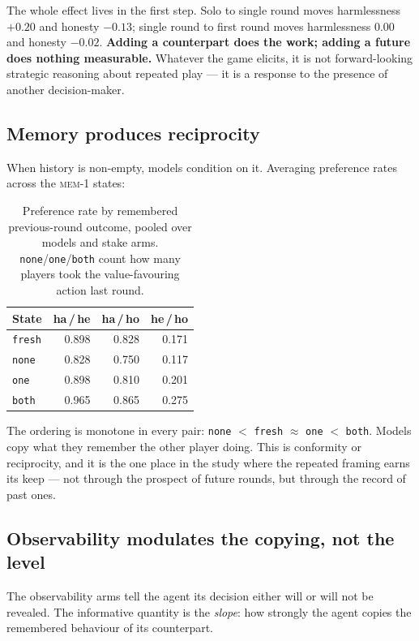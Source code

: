 \documentclass[11pt]{article}
\begin{document}
The whole effect lives in the first step. Solo to single round moves harmlessness
$+0.20$ and honesty $-0.13$; single round to first round moves harmlessness
$0.00$ and honesty $-0.02$. \textbf{Adding a counterpart does the work; adding a
future does nothing measurable.} Whatever the game elicits, it is not
forward-looking strategic reasoning about repeated play --- it is a response to
the presence of another decision-maker.

\subsection{Memory produces reciprocity}

When history is non-empty, models condition on it. Averaging preference rates
across the \textsc{mem-1} states:

\begin{table}[h]\centering\small
\caption{Preference rate by remembered previous-round outcome, pooled over
models and stake arms. \texttt{none}/\texttt{one}/\texttt{both} count how many
players took the value-favouring action last round.}
\label{tab:state}
\begin{tabular}{lrrr}
\toprule
State & ha\,/\,he & ha\,/\,ho & he\,/\,ho \\
\midrule
\texttt{fresh} & 0.898 & 0.828 & 0.171 \\
\texttt{none} & 0.828 & 0.750 & 0.117 \\
\texttt{one} & 0.898 & 0.810 & 0.201 \\
\texttt{both} & 0.965 & 0.865 & 0.275 \\
\bottomrule
\end{tabular}
\end{table}

The ordering is monotone in every pair: \texttt{none} $<$ \texttt{fresh}
$\approx$ \texttt{one} $<$ \texttt{both}. Models copy what they remember the
other player doing. This is conformity or reciprocity, and it is the one place
in the study where the repeated framing earns its keep --- not through the
prospect of future rounds, but through the record of past ones.

\subsection{Observability modulates the copying, not the level}

The observability arms tell the agent its decision either will or will not be
revealed. The informative quantity is the \emph{slope}: how strongly the agent
copies the remembered behaviour of its counterpart.
\end{document}
